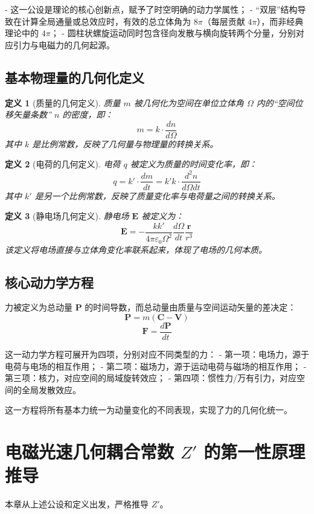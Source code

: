\documentclass[a4paper,12pt]{article}
\theoremstyle{plain}
\newtheorem{definition}{定义}[section]
\renewcommand{\vec}[1]{\bm{#1}}
\begin{document}
- 这一公设是理论的核心创新点，赋予了时空明确的动力学属性；
- “双层”结构导致在计算全局通量或总效应时，有效的总立体角为 $8\pi$（每层贡献 $4\pi$），而非经典理论中的 $4\pi$；
- 圆柱状螺旋运动同时包含径向发散与横向旋转两个分量，分别对应引力与电磁力的几何起源。

\subsection{基本物理量的几何化定义}

\begin{definition}[质量的几何定义]
质量 $m$ 被几何化为空间在单位立体角 $\Omega$ 内的“空间位移矢量条数” $n$ 的密度，即：
$$m = k \cdot \frac{dn}{d\Omega}$$ 
其中 $k$ 是比例常数，反映了几何量与物理量的转换关系。
\end{definition}

\begin{definition}[电荷的几何定义]
电荷 $q$ 被定义为质量的时间变化率，即：
$$q = k' \cdot \frac{dm}{dt} = k'k \cdot \frac{d^2n}{d\Omega dt}$$ 
其中 $k'$ 是另一个比例常数，反映了质量变化率与电荷量之间的转换关系。
\end{definition}

\begin{definition}[静电场几何定义]
静电场 $\vec{E}$ 被定义为：
$$\vec{E} = -\frac{k k'}{4\pi\varepsilon_0 \Omega^2} \frac{d\Omega}{dt} \frac{\vec{r}}{r^3}$$ 
该定义将电场直接与立体角变化率联系起来，体现了电场的几何本质。
\end{definition}

\subsection{核心动力学方程}

力被定义为总动量 $\vec{P}$ 的时间导数，而总动量由质量与空间运动矢量的差决定：
$$\vec{P} = m(\vec{C} - \vec{V})$$
$$\vec{F} = \frac{d\vec{P}}{dt}$$

这一动力学方程可展开为四项，分别对应不同类型的力：
- 第一项：电场力，源于电荷与电场的相互作用；
- 第二项：磁场力，源于运动电荷与磁场的相互作用；
- 第三项：核力，对应空间的局域旋转效应；
- 第四项：惯性力/万有引力，对应空间的全局发散效应。

这一方程将所有基本力统一为动量变化的不同表现，实现了力的几何化统一。

\section{电磁光速几何耦合常数 $Z'$ 的第一性原理推导}
本章从上述公设和定义出发，严格推导 $Z'$。
\end{document}

